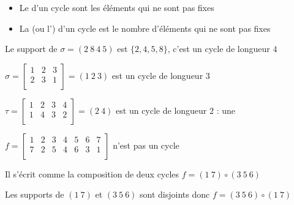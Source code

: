 \begin{frame}

\begin{itemize}
  \item Le  d'un cycle sont les éléments qui ne sont pas fixes 
\pause
  \item La  (ou l') d'un cycle est le nombre d'éléments qui ne sont pas fixes
\end{itemize}

\pause
Le support de $\sigma=(2\ 8\ 4\ 5)$ est $\{2, 4, 5, 8\}$, c'est un cycle de longueur $4$

\pause
\begin{exemple}
$
\sigma = \left[\begin{smallmatrix} 
 1 & 2 & 3 \\  
 2 & 3 & 1 \\      
        \end{smallmatrix} \right]
= (1\ 2\ 3)$ est un cycle de longueur $3$ 

\medskip
\pause

$
\tau = \left[\begin{smallmatrix} 
 1 & 2 & 3 & 4 \\  
 1 & 4 & 3 & 2 \\      
        \end{smallmatrix} \right]
= (2\ 4)$ est un cycle de longueur $2$ : une   
\end{exemple}

\pause
\begin{exemple}
$f =\left[\begin{smallmatrix} 
 1 & 2 & 3 & 4 & 5 & 6 & 7 \\  
 7 & 2 & 5 & 4 & 6 & 3 & 1 \\      
        \end{smallmatrix} \right]
$ n'est pas un cycle

\pause

Il s'écrit comme la composition de deux cycles $f = (1\ 7) \circ (3\ 5\ 6)$

\pause

Les supports de $(1\ 7)$ et $(3\ 5\ 6)$ sont disjoints donc $f = (3\ 5\ 6) \circ (1\ 7)$  
\end{exemple}

\end{frame}



